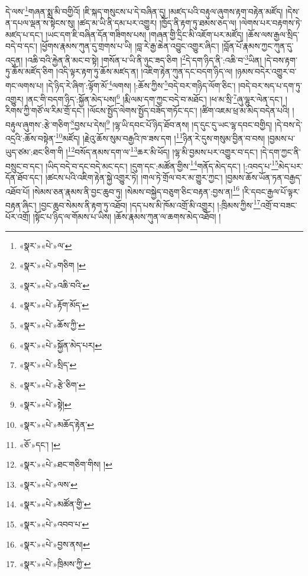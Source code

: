 དེ་ལས་\footnote{«སྣར་»«པེ་»ལ་}གཞན་སྨྲ་མི་བགྱིའོ། །ཇི་སྐད་གསུངས་པ་དེ་བཞིན་དུ། །མཛད་པའི་བརྟུལ་ཞུགས་རྟག་བརྟེན་མཛོད། །དེས་ན་དཔལ་ལྡན་ས་སྟེངས་སུ། །ཚད་མ་ཡི་ནི་དམ་པར་འགྱུར། །ཁྱོད་ནི་རྟག་ཏུ་ཐམས་ཅད་ལ། །ལེགས་པར་བརྟགས་ཏེ་མཛད་པ་དང་། །ཡང་དག་ཇི་བཞིན་དོན་གཟིགས་པས། །གཞན་གྱི་དྲིང་མི་འཇོག་པར་མཛོད། །ཆོས་ལས་རྒྱལ་སྲིད་བདེ་བ་དང་། །ཕྱོགས་རྣམས་ཀུན་དུ་གྲགས་པ་ཡི། །བླ་རེ་རྒྱ་ཆེན་འབྱུང་འགྱུར་ཞིང་། །བློན་པོ་རྣམས་ཀྱང་ཀུན་དུ་འདུན། །འཆི་བའི་རྐྱེན་ནི་མང་བ་སྟེ། །གསོན་པ་ཡི་ནི་ཉུང་ཟད་ཅིག །\footnote{«སྣར་»«པེ་»གཅིག །}དེ་དག་ཉིད་ནི་:འཆི་བ་\footnote{«སྣར་»«པེ་»འཆི་བའི་}ཡིན། །དེ་བས་རྟག་ཏུ་ཆོས་མཛོད་ཅིག །འདི་ལྟར་རྟག་ཏུ་ཆོས་མཛད་ན། །འཇིག་རྟེན་ཀུན་དང་བདག་ཉིད་ལ། །ཉམས་བདེར་འགྱུར་བ་གང་ལགས་པ། །དེ་ཉིད་རེ་ཞིག་:ལྟོག་མོ་\footnote{«སྣར་»«པེ་»རྟོག་མོད་}ལགས། །:ཆོས་ཀྱིས་\footnote{«སྣར་»«པེ་»ཆོས་ཀྱི་}བདེ་བར་གཉིད་ལོག་ཅིང་། །བདེ་བར་སད་པ་དག་ཏུ་འགྱུར། །ནང་གི་བདག་ཉིད་:སྐྱོན་མེད་པས།\footnote{«སྣར་»«པེ་»སྐྱོན་མེད་པར།} །རྨི་ལམ་དག་ཀྱང་བདེ་བ་མཐོང་། །ཕ་མ་སྲི་\footnote{«སྣར་»«པེ་»སྲིད་}ཞུ་ལྷུར་ལེན་དང་། །རིགས་ཀྱི་གཙོ་ལ་རིམ་གྲོ་དང་། །ལོངས་སྤྱོད་ལེགས་སྤྱོད་བཟོད་གཏོང་དང་། །ཚིག་འཇམ་ཕྲ་མ་མེད་བདེན་པའི། །བརྟུལ་ཞུགས་:རྩེ་གཅིག་\footnote{«སྣར་»«པེ་»རྩེ་ཅིག་}བྱས་པ་དེས།\footnote{«སྣར་»«པེ་»སྟེ།} །ལྷ་ཡི་དབང་པོ་ཉིད་ཐོབ་ནས། །ད་དུང་དུ་ཡང་ལྷ་དབང་བགྱིད། །དེ་བས་དེ་འདྲའི་:ཆོས་བསྟེན་\footnote{«སྣར་»«པེ་»མཆོད་རྟེན་}མཛོད། །རྗེའུ་ཆོས་སུམ་བརྒྱའི་ཁ་ཟས་དག །\footnote{«ཅོ་»དང་། །}ཉིན་རེ་དུས་གསུམ་བྱིན་བ་བས། །བྱམས་པ་ཡུད་ཙམ་:ཐང་ཅིག་གི །\footnote{«སྣར་»«པེ་»ཐང་གཅིག་གིས། །}བསོད་ནམས་དག་ལ་\footnote{«སྣར་»«པེ་»ལས་}ཆར་མི་ཕོད། །ལྷ་མི་བྱམས་པར་འགྱུར་བ་དང་། །དེ་དག་ཀྱང་ནི་བསྲུང་བ་དང་། །ཡིད་བདེ་བ་དང་བདེ་མང་དང་། །དུག་དང་:མཚོན་གྱིས་\footnote{«སྣར་»«པེ་»མཚོན་གྱི་}གནོད་མེད་དང་། །:འབད་པ་\footnote{«སྣར་»«པེ་»འབབ་པ་}མེད་པར་དོན་ཐོབ་དང་། །ཚངས་པའི་འཇིག་རྟེན་སྐྱེ་འགྱུར་ཏེ། །གལ་ཏེ་གྲོལ་བར་མ་གྱུར་ཀྱང་། །བྱམས་ཆོས་ཡོན་ཏན་བརྒྱད་འཐོབ་པོ། །སེམས་ཅན་རྣམས་ནི་བྱང་ཆུབ་ཏུ། །སེམས་བསྐྱེད་བཅུག་ཅིང་བརྟན་:བྱས་ན།\footnote{«སྣར་»«པེ་»བྱས་ནས།} །རི་དབང་རྒྱལ་པོ་ལྟར་བརྟན་ཞིང་། །བྱང་ཆུབ་སེམས་ནི་རྟག་ཏུ་འཐོབ། །དད་པས་མི་ཁོམ་འགྲོ་མི་འགྱུར། །:ཁྲིམས་ཀྱིས་\footnote{«སྣར་»«པེ་»ཁྲིམས་ཀྱི་}འགྲོ་བ་བཟང་པོར་འགྲོ། །སྟོང་པ་ཉིད་ལ་གོམས་པ་ཡིས། །ཆོས་རྣམས་ཀུན་ལ་ཆགས་མེད་འཐོབ། །
